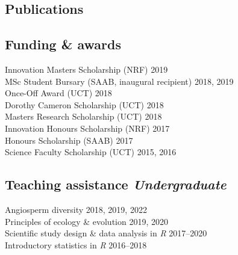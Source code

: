 \documentclass[10pt]{article}
\begin{document}


\bigskip



\subsection*{Publications} %



\hrulefill

\begin{multicols}{2} %

\subsection*{Funding \& awards} %

Innovation Masters Scholarship {\small  (NRF)}     \hfill {\small       2019} \\
MSc Student Bursary            {\small (SAAB, inaugural recipient)}
                                                   \hfill {\small 2018, 2019} \\
Once-Off Award                 {\small  (UCT)}     \hfill {\small       2018} \\
Dorothy Cameron Scholarship    {\small  (UCT)}     \hfill {\small       2018} \\
Masters Research Scholarship   {\small  (UCT)}     \hfill {\small       2018} \\
Innovation Honours Scholarship {\small  (NRF)}     \hfill {\small       2017} \\
Honours Scholarship            {\small (SAAB)}     \hfill {\small       2017} \\
Science Faculty Scholarship    {\small  (UCT)}     \hfill {\small 2015, 2016}

\subsection*{Teaching assistance %
                                \hfill {\small \textmd{\textit{Undergraduate}}}}

Angiosperm diversity                         \hfill {\small 2018, 2019, 2022} \\
Principles of ecology \& evolution           \hfill {\small       2019, 2020} \\
Scientific study design \& data analysis in \textit{R}
                                             \hfill {\small       2017--2020} \\
Introductory statistics in \textit{R}        \hfill {\small       2016--2018}


\end{multicols}
\end{document}

